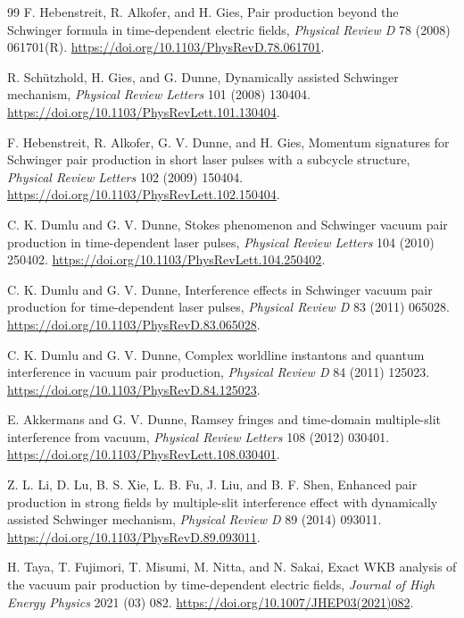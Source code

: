 \documentclass[11pt,a4paper]{article}
\begin{document}
\begin{thebibliography}{99}
F. Hebenstreit, R. Alkofer, and H. Gies, Pair production beyond the Schwinger formula in time-dependent electric fields, \textit{Physical Review D} 78 (2008) 061701(R). \url{https://doi.org/10.1103/PhysRevD.78.061701}.

R. Sch\"utzhold, H. Gies, and G. Dunne, Dynamically assisted Schwinger mechanism, \textit{Physical Review Letters} 101 (2008) 130404. \url{https://doi.org/10.1103/PhysRevLett.101.130404}.

F. Hebenstreit, R. Alkofer, G. V. Dunne, and H. Gies, Momentum signatures for Schwinger pair production in short laser pulses with a subcycle structure, \textit{Physical Review Letters} 102 (2009) 150404. \url{https://doi.org/10.1103/PhysRevLett.102.150404}.

C. K. Dumlu and G. V. Dunne, Stokes phenomenon and Schwinger vacuum pair production in time-dependent laser pulses, \textit{Physical Review Letters} 104 (2010) 250402. \url{https://doi.org/10.1103/PhysRevLett.104.250402}.

C. K. Dumlu and G. V. Dunne, Interference effects in Schwinger vacuum pair production for time-dependent laser pulses, \textit{Physical Review D} 83 (2011) 065028. \url{https://doi.org/10.1103/PhysRevD.83.065028}.

C. K. Dumlu and G. V. Dunne, Complex worldline instantons and quantum interference in vacuum pair production, \textit{Physical Review D} 84 (2011) 125023. \url{https://doi.org/10.1103/PhysRevD.84.125023}.

E. Akkermans and G. V. Dunne, Ramsey fringes and time-domain multiple-slit interference from vacuum, \textit{Physical Review Letters} 108 (2012) 030401. \url{https://doi.org/10.1103/PhysRevLett.108.030401}.

Z. L. Li, D. Lu, B. S. Xie, L. B. Fu, J. Liu, and B. F. Shen, Enhanced pair production in strong fields by multiple-slit interference effect with dynamically assisted Schwinger mechanism, \textit{Physical Review D} 89 (2014) 093011. \url{https://doi.org/10.1103/PhysRevD.89.093011}.

H. Taya, T. Fujimori, T. Misumi, M. Nitta, and N. Sakai, Exact WKB analysis of the vacuum pair production by time-dependent electric fields, \textit{Journal of High Energy Physics} 2021 (03) 082. \url{https://doi.org/10.1007/JHEP03(2021)082}.


\end{thebibliography}
\end{document}
